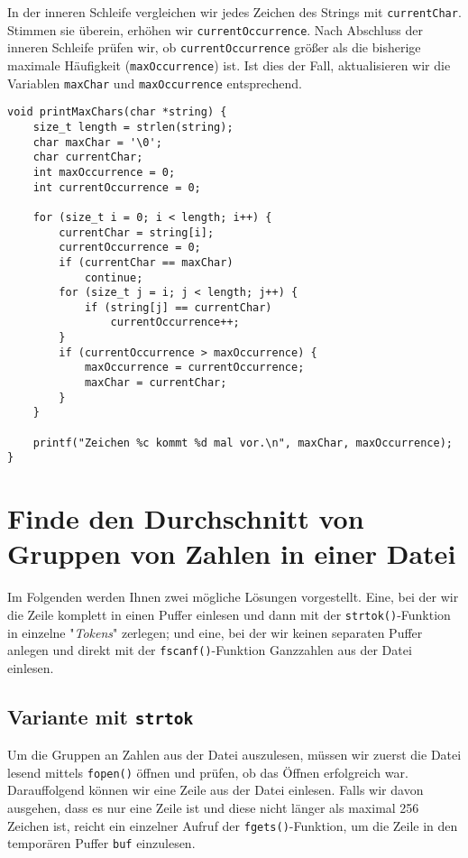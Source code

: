 In der inneren Schleife vergleichen wir jedes Zeichen des Strings mit
\texttt{currentChar}. Stimmen sie überein, erhöhen wir
\texttt{currentOccurrence}. Nach Abschluss der inneren Schleife prüfen
wir, ob \texttt{currentOccurrence} größer als die bisherige maximale
Häufigkeit (\texttt{maxOccurrence}) ist. Ist dies der Fall, aktualisieren
wir die Variablen \texttt{maxChar} und \texttt{maxOccurrence}
entsprechend.

\begin{verbatim}
void printMaxChars(char *string) {
    size_t length = strlen(string);
    char maxChar = '\0';
    char currentChar;
    int maxOccurrence = 0;
    int currentOccurrence = 0;

    for (size_t i = 0; i < length; i++) {
        currentChar = string[i];
        currentOccurrence = 0;
        if (currentChar == maxChar)
            continue;
        for (size_t j = i; j < length; j++) {
            if (string[j] == currentChar)
                currentOccurrence++;
        }
        if (currentOccurrence > maxOccurrence) {
            maxOccurrence = currentOccurrence;
            maxChar = currentChar;
        }
    }

    printf("Zeichen %c kommt %d mal vor.\n", maxChar, maxOccurrence);
}
\end{verbatim}






\chapter{Finde den Durchschnitt von Gruppen von Zahlen in einer Datei}

Im Folgenden werden Ihnen zwei mögliche Lösungen vorgestellt. Eine, bei der wir
die Zeile komplett in einen Puffer einlesen und dann mit der
\texttt{strtok()}-Funktion in einzelne "\textit{Tokens}" zerlegen; und
eine, bei der wir keinen separaten Puffer anlegen und direkt mit der
\texttt{fscanf()}-Funktion Ganzzahlen aus der Datei einlesen.

\section*{Variante mit \texttt{strtok}}

Um die Gruppen an Zahlen aus der Datei auszulesen, müssen wir zuerst die Datei
lesend mittels \texttt{fopen()} öffnen und prüfen, ob das Öffnen
erfolgreich war. Darauffolgend können wir eine Zeile aus der Datei einlesen.
Falls wir davon ausgehen, dass es nur eine Zeile ist und diese nicht länger als
maximal 256 Zeichen ist, reicht ein einzelner Aufruf der
\texttt{fgets()}-Funktion, um die Zeile in den temporären Puffer
\texttt{buf} einzulesen.

